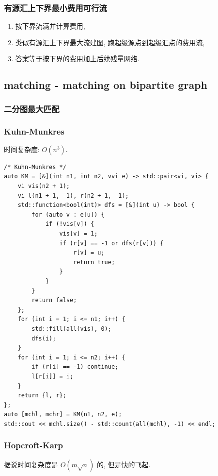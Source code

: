 \documentclass[UTF8, a4paper, titlepage, twoside]{ctexart}
\begin{document}
\subsubsection{ 有源汇上下界最小费用可行流 }
\begin{enumerate}
    \item 按下界流满并计算费用,
    \item 类似有源汇上下界最大流建图, 跑超级源点到超级汇点的费用流,
    \item 答案等于按下界的费用加上后续残量网络.
\end{enumerate}

\subsection{ matching - matching on bipartite graph }
\subsubsection*{ 二分图最大匹配 }
\subsubsection*{ Kuhn-Munkres }
时间复杂度: \(O(n^3)\).

\begin{lstlisting}[style=cpp]
/* Kuhn-Munkres */
auto KM = [&](int n1, int n2, vvi e) -> std::pair<vi, vi> {
    vi vis(n2 + 1);
    vi l(n1 + 1, -1), r(n2 + 1, -1);
    std::function<bool(int)> dfs = [&](int u) -> bool {
        for (auto v : e[u]) {
            if (!vis[v]) {
                vis[v] = 1;
                if (r[v] == -1 or dfs(r[v])) {
                    r[v] = u;
                    return true;
                }
            }
        }
        return false;
    };
    for (int i = 1; i <= n1; i++) {
        std::fill(all(vis), 0);
        dfs(i);
    }
    for (int i = 1; i <= n2; i++) {
        if (r[i] == -1) continue;
        l[r[i]] = i;
    }
    return {l, r};
};
auto [mchl, mchr] = KM(n1, n2, e);
std::cout << mchl.size() - std::count(all(mchl), -1) << endl;
\end{lstlisting}

\subsubsection*{ Hopcroft-Karp }
据说时间复杂度是 \(O(m \sqrt{n})\) 的, 但是快的飞起.
\end{document}
